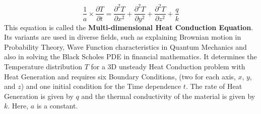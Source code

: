 \begin{equation}
    \frac{1}{a} \times \frac{\partial T}{\partial t} = \frac{\partial^2 T}{\partial x^2}
+ \frac{\partial^2 T}{\partial y^2} + \frac{\partial^2 T}{\partial z^2} + \frac{q}{k}
\label{Multi-dimensional Heat Conduction Equation}
\end{equation}
    This equation is called the \textbf{Multi-dimensional Heat Conduction Equation}. 
Its variants are used in diverse fields, such as explaining Brownian motion in Probability Theory, 
Wave Function characteristics in Quantum Mechanics and also in solving the Black Scholes PDE in financial mathematics.
It determines the Temperature distribution $T$ for a 3D unsteady Heat Conduction
problem with Heat Generation and requires six Boundary Conditions, (two for
each axis, $x$, $y$, and $z$) and one initial condition for the Time dependence $t$. The rate of Heat
Generation is given by $q$ and the thermal conductivity of the material is given by $k$. Here, $a$ is a constant.
